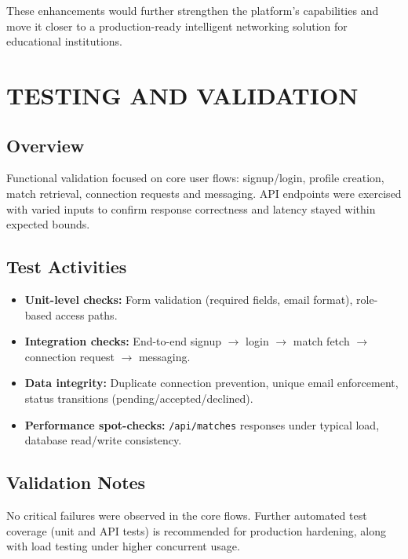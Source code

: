 \documentclass[12pt,a4paper]{report}
\let\origsection\section
\renewcommand{\section}{\needspace{4\baselineskip}\origsection}
\begin{document}
\noindent
These enhancements would further strengthen the platform's capabilities and move it closer to a production-ready intelligent networking solution for educational institutions.


\chapter{TESTING AND VALIDATION}
\thispagestyle{fancy}

\section{Overview}

Functional validation focused on core user flows: signup/login, profile creation, match retrieval, connection requests and messaging. API endpoints were exercised with varied inputs to confirm response correctness and latency stayed within expected bounds.

\section{Test Activities}

\begin{itemize}[noitemsep]
    \item \textbf{Unit-level checks:} Form validation (required fields, email format), role-based access paths.
    \item \textbf{Integration checks:} End-to-end signup $\rightarrow$ login $\rightarrow$ match fetch $\rightarrow$ connection request $\rightarrow$ messaging.
    \item \textbf{Data integrity:} Duplicate connection prevention, unique email enforcement, status transitions (pending/accepted/declined).
    \item \textbf{Performance spot-checks:} \texttt{/api/matches} responses under typical load, database read/write consistency.
\end{itemize}

\section{Validation Notes}

No critical failures were observed in the core flows. Further automated test coverage (unit and API tests) is recommended for production hardening, along with load testing under higher concurrent usage.
\end{document}
